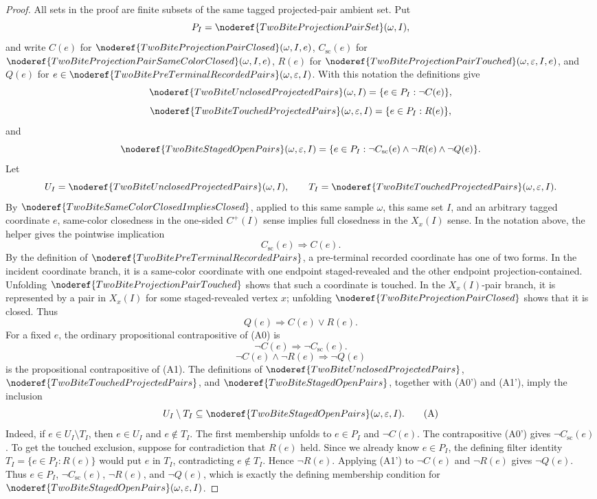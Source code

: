 \begin{proof}
All sets in the proof are finite subsets of the same tagged projected-pair
ambient set.  Put
\[
P_I=\noderef{TwoBiteProjectionPairSet}(\omega,I),
\]
and write \(C(e)\) for
\(\noderef{TwoBiteProjectionPairClosed}(\omega,I,e)\),
\(C_{\mathrm{sc}}(e)\) for
\(\noderef{TwoBiteProjectionPairSameColorClosed}(\omega,I,e)\), \(R(e)\)
for \(\noderef{TwoBiteProjectionPairTouched}(\omega,\varepsilon,I,e)\), and
\(Q(e)\) for
\(e\in\noderef{TwoBitePreTerminalRecordedPairs}(\omega,\varepsilon,I)\).  With
this notation the definitions give
\[
\noderef{TwoBiteUnclosedProjectedPairs}(\omega,I)
  =\{e\in P_I:\neg C(e)\},
\]
\[
\noderef{TwoBiteTouchedProjectedPairs}(\omega,\varepsilon,I)
  =\{e\in P_I:R(e)\},
\]
and
\[
\noderef{TwoBiteStagedOpenPairs}(\omega,\varepsilon,I)
  =\{e\in P_I:\neg C_{\mathrm{sc}}(e)\wedge\neg R(e)\wedge\neg Q(e)\}.
\]
Let
\[
U_I=\noderef{TwoBiteUnclosedProjectedPairs}(\omega,I),\qquad
T_I=\noderef{TwoBiteTouchedProjectedPairs}(\omega,\varepsilon,I).
\]
By \(\noderef{TwoBiteSameColorClosedImpliesClosed}\), applied to this same
sample \(\omega\), this same set \(I\), and an arbitrary tagged coordinate
\(e\), same-color closedness in the one-sided \(C^+(I)\) sense implies full
closedness in the \(X_x(I)\) sense.  In the notation above, the helper gives
the pointwise implication
\[
C_{\mathrm{sc}}(e)\Longrightarrow C(e).
\tag{A0}
\]
By the definition of \(\noderef{TwoBitePreTerminalRecordedPairs}\), a
pre-terminal recorded coordinate has one of two forms.  In the incident
coordinate branch, it is a same-color coordinate with one endpoint
staged-revealed and the other endpoint projection-contained.  Unfolding
\(\noderef{TwoBiteProjectionPairTouched}\) shows that such a coordinate is
touched.  In the \(X_x(I)\)-pair branch, it is represented by a pair in
\(X_x(I)\) for some staged-revealed vertex \(x\);
unfolding \(\noderef{TwoBiteProjectionPairClosed}\) shows that it is closed.
Thus
\[
Q(e)\Longrightarrow C(e)\vee R(e).
\tag{A1}
\]
For a fixed \(e\), the ordinary propositional contrapositive of (A0) is
\[
\neg C(e)\Longrightarrow \neg C_{\mathrm{sc}}(e).
\tag{A0'}
\]
\[
\neg C(e)\wedge\neg R(e)\Longrightarrow \neg Q(e)
\tag{A1'}
\]
is the propositional contrapositive of (A1).
The definitions of \(\noderef{TwoBiteUnclosedProjectedPairs}\),
\(\noderef{TwoBiteTouchedProjectedPairs}\), and
\(\noderef{TwoBiteStagedOpenPairs}\), together with (A0') and (A1'), imply the inclusion
\[
U_I\setminus T_I
\subseteq
\noderef{TwoBiteStagedOpenPairs}(\omega,\varepsilon,I).
\tag{A}
\]
Indeed, if \(e\in U_I\setminus T_I\), then \(e\in U_I\) and \(e\notin T_I\).
The first membership unfolds to \(e\in P_I\) and \(\neg C(e)\).  The
contrapositive (A0') gives \(\neg C_{\mathrm{sc}}(e)\).  To get the touched
exclusion, suppose for contradiction that
\(R(e)\) held.  Since we already know
\(e\in P_I\), the defining filter identity
\(T_I=\{e\in P_I:R(e)\}\) would put \(e\) in \(T_I\), contradicting
\(e\notin T_I\).  Hence \(\neg R(e)\).  Applying (A1') to
\(\neg C(e)\) and \(\neg R(e)\) gives \(\neg Q(e)\).  Thus \(e\in P_I\),
\(\neg C_{\mathrm{sc}}(e)\), \(\neg R(e)\), and \(\neg Q(e)\), which is
exactly the defining membership condition for
\(\noderef{TwoBiteStagedOpenPairs}(\omega,\varepsilon,I)\).


\end{proof}

